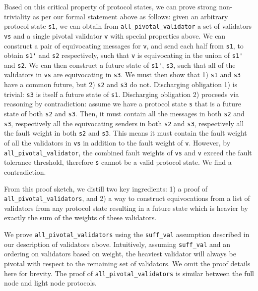 \documentclass[runningheads]{llncs}
\begin{document}
Based on this critical property of protocol states, we can prove strong non-triviality as per our formal statement above as follows: given an arbitrary protocol state \verb|s1|, we can obtain from \verb|all_pivotal_validator| a set of validators \verb|vs| and a single pivotal validator \verb|v| with special properties above. We can construct a pair of equivocating messages for \verb|v|, and send each half from \verb|s1|, to obtain \verb|s1'| and \verb|s2| respectively, such that \verb|v| is equivocating in the union of \verb|s1'| and \verb|s2|. We can then construct a future state of \verb|s1'|, \verb|s3|, such that all of the validators in \verb|vs| are equivocating in \verb|s3|. We must then show that 1) \verb|s1| and \verb|s3| have a common future, but 2) \verb|s2| and \verb|s3| do not. Discharging obligation 1) is trivial: \verb|s3| is itself a future state of \verb|s1|. Discharging obligation 2) proceeds via reasoning by contradiction: assume we have a protocol state \verb|s| that is a future state of both \verb|s2| and \verb|s3|. Then, it must contain all the messages in both \verb|s2| and \verb|s3|, respectively all the equivocating senders in both \verb|s2| and \verb|s3|, respectively all the fault weight in both \verb|s2| and \verb|s3|. This means it must contain the fault weight of all the validators in \verb|vs| in addition to the fault weight of \verb|v|. However, by \verb|all_pivotal_validator|, the combined fault weights of \verb|vs| and \verb|v| exceed the fault tolerance threshold, therefore \verb|s| cannot be a valid protocol state. We find a contradiction.

From this proof sketch, we distill two key ingredients: 1) a proof of \\ \verb|all_pivotal_validators|, and 2) a way to construct equivocations from a list of validators from any protocol state resulting in a future state which is heavier by exactly the sum of the weights of these validators.

We prove \verb|all_pivotal_validators| using the \verb|suff_val| assumption described in our description of validators above. Intuitively, assuming \verb|suff_val| and an ordering on validators based on weight, the heaviest validator will always be pivotal with respect to the remaining set of validators. We omit the proof details here for brevity. The proof of \verb|all_pivotal_validators| is similar between the full node and light node protocols.
\end{document}
